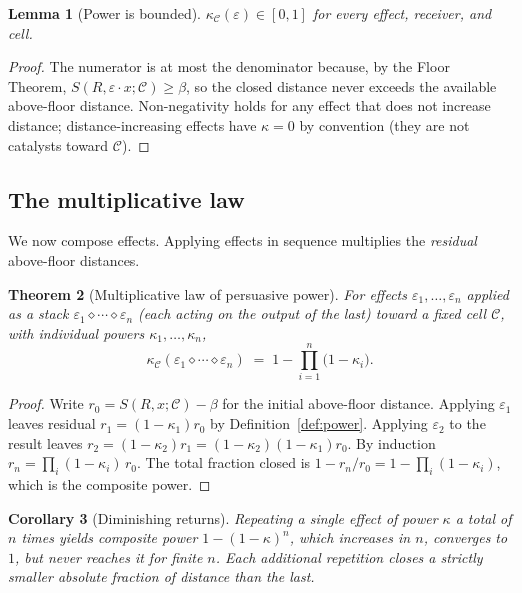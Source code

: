 \documentclass[twocolumn,11pt,a4paper]{article}
\theoremstyle{adv}
\newtheorem{theorem}{Theorem}[section]
\newtheorem{lemma}[theorem]{Lemma}
\newtheorem{corollary}[theorem]{Corollary}
\theoremstyle{definition}
\theoremstyle{remark}
\newcommand{\Cell}{\mathcal{C}}        %
\newcommand{\Recv}{R}                  %
\newcommand{\Sval}{S}                  %
\newcommand{\floor}{\beta}            %
\newcommand{\Eff}{\varepsilon}        %
\newcommand{\pot}{\kappa}             %
\begin{document}
\begin{lemma}[Power is bounded]
\label{lem:powerbound}
$\pot_\Cell(\Eff)\in[0,1]$ for every effect, receiver, and cell.
\end{lemma}

\begin{proof}
The numerator is at most the denominator because, by the Floor Theorem,
$\Sval(\Recv,\Eff\!\cdot x;\Cell)\ge\floor$, so the closed distance never
exceeds the available above-floor distance. Non-negativity holds for any
effect that does not increase distance; distance-increasing effects have
$\pot=0$ by convention (they are not catalysts toward $\Cell$).
\end{proof}

\subsection{The multiplicative law}

We now compose effects. Applying effects in sequence multiplies the
\emph{residual} above-floor distances.

\begin{theorem}[Multiplicative law of persuasive power]
\label{thm:multiplicative}
For effects $\Eff_1,\dots,\Eff_n$ applied as a stack
$\Eff_1\diamond\cdots\diamond\Eff_n$ (each acting on the output of the
last) toward a fixed cell $\Cell$, with individual powers
$\pot_1,\dots,\pot_n$,
\[
  \pot_\Cell(\Eff_1\diamond\cdots\diamond\Eff_n)
  \;=\;1-\prod_{i=1}^{n}\bigl(1-\pot_i\bigr).
\]
\end{theorem}

\begin{proof}
Write $r_0=\Sval(\Recv,x;\Cell)-\floor$ for the initial above-floor
distance. Applying $\Eff_1$ leaves residual $r_1=(1-\pot_1)r_0$ by
Definition~\ref{def:power}. Applying $\Eff_2$ to the result leaves
$r_2=(1-\pot_2)r_1=(1-\pot_2)(1-\pot_1)r_0$. By induction
$r_n=\prod_i(1-\pot_i)\,r_0$. The total fraction closed is
$1-r_n/r_0=1-\prod_i(1-\pot_i)$, which is the composite power.
\end{proof}

\begin{corollary}[Diminishing returns]
\label{cor:diminishing}
Repeating a single effect of power $\pot$ a total of $n$ times yields
composite power $1-(1-\pot)^n$, which increases in $n$, converges to $1$,
but never reaches it for finite $n$. Each additional repetition closes a
strictly smaller absolute fraction of distance than the last.
\end{corollary}
\end{document}
